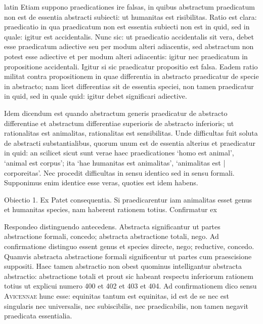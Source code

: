 \begin{otherlanguage*}{latin}
\pstart
  Etiam suppono praedicationes ire falsas, in quibus abstractum praedicatum non est de essentia abstracti subiecti: ut humanitas est risibilitas. Ratio est clara: praedicatio in qua praedicatum non est essentia subiecti non est in quid, sed in quale: igitur est accidentalis. Nunc sic: ut praedicatio accidentalis sit vera, debet esse praedicatum adiective seu per modum alteri adiacentis, sed abstractum non potest esse adiective et per modum alteri adiacentis: igitur nec praedicatum in propositione accidentali. Igitur si sic praedicatur propositio est falsa. Eadem ratio militat contra propositionem in quae differentia in abstracto praedicatur de specie in abstracto; nam licet differentias sit de essentia speciei, non tamen praedicatur in quid, sed in quale quid: igitur debet significari adiective. 
\pend

\pstart
  Idem dicendum est quando abstractum generis praedicatur de abstracto differentiae et abstractum differentiae superioris de abstracto inferioris; ut rationalitas est animalitas, rationalitas est sensibilitas. Unde difficultas fuit soluta de abstracti substantialibus, quorum unum est de essentia alterius et praedicatur in quid: an scilicet sicut sunt verae haec praedicationes `homo est animal', `animal est corpus'; ita `hae humanitas est animalitas', `animalitas est \textnormal{|} corporeitas'. Nec procedit difficultas in sensu identico sed in sensu formali. Supponimus enim identice esse veras, quoties est idem habens. 
\pend

\pstart
  Obiectio 1. Ex  Patet consequentia. Si praedicarentur iam animalitas esset genus et humanitas species, nam haberent rationem totius. Confirmatur ex   
\pend

\pstart
  Respondeo distinguendo antecedens. Abstracta significantur ut partes abstractione formali, concedo; abstracta abstractione totali, nego. Ad confirmatione distinguo essent genus et species directe, nego; reductive, concedo. Quamvis abstracta abstractione formali significentur ut partes cum praescisione suppositi. Haec tamen abstractio non obest quominus intelligantur abstracta abstractio: abstractione totali et prout sic habeant respectu inferiorum rationem totius ut explicui numero 400 et 402 et 403 et 404. Ad confirmationem dico sensu \textsc{Avicennae} hunc esse: equinitas tantum est equinitas, id est de se nec est singularis nec universalis, nec subiscibilis, nec praedicabilis, non tamen negavit praedicata essentialia. 
\pend


\end{otherlanguage*}
